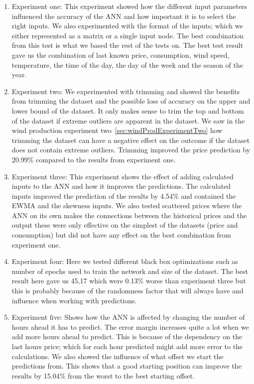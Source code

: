 \begin{enumerate}
	\item Experiment one: This experiment showed how the different input parameters influenced the accuracy of the ANN and how important it is to select the right inputs. We also experimented with the format of the inputs; which we either represented as a matrix or a single input node. The best combination from this test is what we based the rest of the tests on. The best test result gave us the combination of last known price, consumption, wind speed, temperature, the time of the day, the day of the week and the season of the year.
	\item Experiment two: We experimented with trimming and showed the benefits from trimming the dataset and the possible loss of accuracy on the upper and lower bound of the dataset. It only makes sense to trim the top and bottom of the dataset if extreme outliers are apparent in the dataset. We saw in the wind production experiment two~\ref{sec:windProdExperimentTwo} how trimming the dataset can have a negative effect on the outcome if the dataset does not contain extreme outliers. Trimming improved the price prediction by 20.99\% compared to the results from experiment one.
	\item Experiment three: This experiment shows the effect of adding calculated inputs to the ANN and how it improves the predictions. The calculated inputs improved the prediction of the results by 4.54\% and contained the EWMA and the skewness inputs. We also tested scattered prices where the ANN on its own makes the connections between the historical prices and the output these were only effective on the simplest of the datasets (price and consumption) but did not have any effect on the best combination from experiment one.
	\item Experiment four: Here we tested different black box optimizations such as number of epochs used to train the network and size of the dataset. The best result here gave us 45,17 which were 0.13\% worse than experiment three but this is probably because of the randomness factor that will always have and influence when working with predictions.
	\item Experiment five: Shows how the ANN is affected by changing the number of hours ahead it has to predict. The error margin increases quite a lot when we add more hours ahead to predict. This is because of the dependency on the last hours price; which for each hour predicted might add more error to the calculations. We also showed the influence of what offset we start the predictions from. This shows that a good starting position can improve the results by 15.04\% from the worst to the best starting offset.
\end{enumerate}